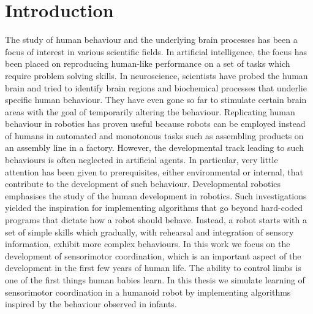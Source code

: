 \chapter{Introduction}

The study of human behaviour and the underlying brain processes has been a focus 
of interest in various scientific fields. In artificial intelligence, the focus 
has been placed on reproducing human-like performance on a set of tasks which 
require problem solving skills. In neuroscience, scientists have probed the 
human brain and tried to identify brain regions and biochemical processes that 
underlie specific human behaviour. They have even gone so far to stimulate 
certain brain areas with the goal of temporarily altering the behaviour.
Replicating human behaviour in robotics has proven useful because robots can be 
employed instead of humans in automated and monotonous tasks such as assembling 
products on an assembly line in a factory.
However, the developmental track leading to such behaviours is often neglected in artificial agents. 
In particular, very little attention has been given to prerequisites, either environmental or internal, that contribute to the development of such behaviour. 
Developmental robotics emphasises the study of the human development in robotics. Such investigations yielded the inspiration for implementing algorithms that go beyond hard-coded programs that dictate how a robot should behave. Instead, a robot starts with a set of simple skills which gradually, with rehearsal and integration of sensory information, exhibit more complex behaviours. In this work we focus on the development of sensorimotor coordination, which is an important aspect of the development in the first few years of human life.
The ability to control limbs is one of the first things human babies learn.
In this thesis we simulate learning of sensorimotor 
coordination in a humanoid robot by implementing algorithms inspired by the 
behaviour observed in infants.

